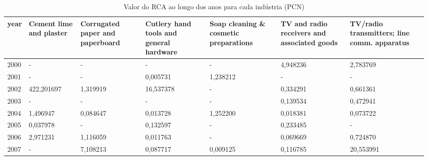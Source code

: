 \begin{table}
\centering
\caption{Valor do RCA ao longo dos anos para cada indústria (PCN)}
\begin{tabular}{p{1cm}p{2cm}p{2cm}p{2cm}p{2cm}p{2cm}p{2cm}}
\toprule
 year &  Cement lime and plaster &  Corrugated paper and paperboard &  Cutlery hand tools and general hardware &  Soap cleaning \& cosmetic preparations &  TV and radio receivers and associated goods &  TV/radio transmitters; line comm. apparatus \\
\midrule
 2000 &                        - &                                - &                                        - &                                      - &                                     4,948236 &                                     2,783769 \\
 2001 &                        - &                                - &                                 0,005731 &                               1,238212 &                                            - &                                            - \\
 2002 &               422,201697 &                         1,319919 &                                16,537378 &                                      - &                                     0,334291 &                                     0,661361 \\
 2003 &                        - &                                - &                                        - &                                      - &                                     0,139534 &                                     0,472941 \\
 2004 &                 1,496947 &                         0,084647 &                                 0,013728 &                               1,252200 &                                     0,018381 &                                     0,073722 \\
 2005 &                 0,037978 &                                - &                                 0,132597 &                                      - &                                     0,233485 &                                            - \\
 2006 &                 2,971231 &                         1,116059 &                                 0,011763 &                                      - &                                     0,069669 &                                     0,724870 \\
 2007 &                        - &                         7,108213 &                                 0,087717 &                               0,009125 &                                     0,116785 &                                    20,553991 \\

\end{tabular}
\end{table}
